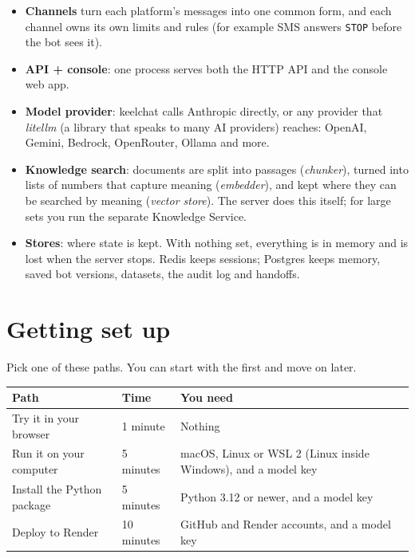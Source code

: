 \documentclass[11pt,a4paper]{article}
\newcommand{\codeus}{\textunderscore\allowbreak}
\newcommand{\code}[1]{{\renewcommand{\_}{\codeus}\texttt{\upshape #1}}}
\begin{document}
\begin{itemize}[leftmargin=1.2em]
  \item \textbf{Channels} turn each platform's messages into one common form, and each channel owns its own
    limits and rules (for example SMS answers \code{STOP} before the bot sees it).
  \item \textbf{API + console}: one process serves both the HTTP API and the console web app.
  \item \textbf{Model provider}: keelchat calls Anthropic directly, or any provider that
    \emph{litellm} (a library that speaks to many AI providers) reaches: OpenAI, Gemini, Bedrock,
    OpenRouter, Ollama and more.
  \item \textbf{Knowledge search}: documents are split into passages (\emph{chunker}), turned into lists of
    numbers that capture meaning (\emph{embedder}), and kept where they can be searched by meaning
    (\emph{vector store}). The server does this itself; for large sets you run the separate Knowledge Service.
  \item \textbf{Stores}: where state is kept. With nothing set, everything is in memory and is lost when the server
    stops. Redis keeps sessions; Postgres keeps memory, saved bot versions, datasets, the audit log and handoffs.
\end{itemize}

\section{Getting set up}

Pick one of these paths. You can start with the first and move on later.

\begin{center}
\begin{tabularx}{\textwidth}{@{}L{4.0cm}L{2.0cm}Y@{}}
\toprule
\textbf{Path} & \textbf{Time} & \textbf{You need} \\
\midrule
Try it in your browser & 1 minute & Nothing \\
Run it on your computer & 5 minutes & macOS, Linux or WSL 2 (Linux inside Windows), and a model key \\
Install the Python package & 5 minutes & Python 3.12 or newer, and a model key \\
Deploy to Render & 10 minutes & GitHub and Render accounts, and a model key \\
\bottomrule
\end{tabularx}
\end{center}
\end{document}
